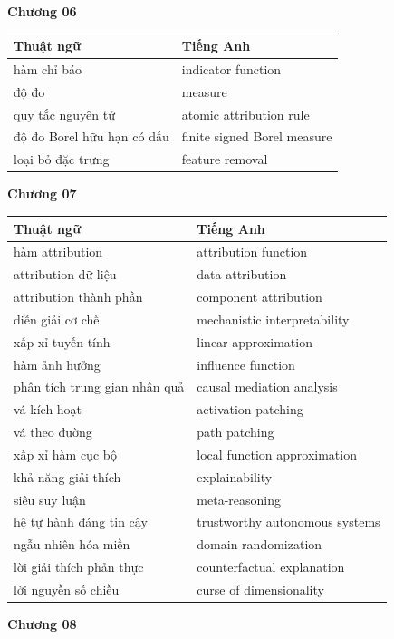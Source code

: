 \medskip

\textbf{Chương 06}

\begin{tabular}{@{}lp{7cm}@{}}
\toprule
Thuật ngữ & Tiếng Anh \\
\midrule
hàm chỉ báo & indicator function \\
độ đo & measure \\
quy tắc nguyên tử & atomic attribution rule \\
độ đo Borel hữu hạn có dấu & finite signed Borel measure \\
loại bỏ đặc trưng & feature removal \\
\bottomrule
\end{tabular}

\medskip

\textbf{Chương 07}

\begin{tabular}{@{}lp{7cm}@{}}
\toprule
Thuật ngữ & Tiếng Anh \\
\midrule
hàm attribution & attribution function \\
attribution dữ liệu & data attribution \\
attribution thành phần & component attribution \\
diễn giải cơ chế & mechanistic interpretability \\
xấp xỉ tuyến tính & linear approximation \\
hàm ảnh hưởng & influence function \\
phân tích trung gian nhân quả & causal mediation analysis \\
vá kích hoạt & activation patching \\
vá theo đường & path patching \\
xấp xỉ hàm cục bộ & local function approximation \\
khả năng giải thích & explainability \\
siêu suy luận & meta-reasoning \\
hệ tự hành đáng tin cậy & trustworthy autonomous systems \\
ngẫu nhiên hóa miền & domain randomization \\
lời giải thích phản thực & counterfactual explanation \\
lời nguyền số chiều & curse of dimensionality \\
\bottomrule
\end{tabular}

\medskip

\textbf{Chương 08}


